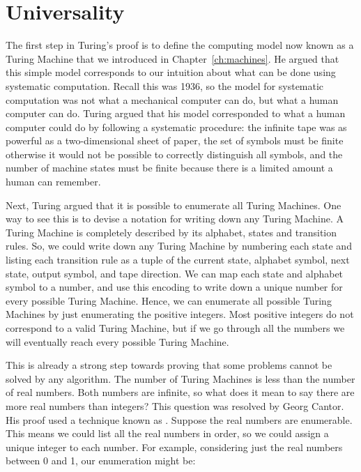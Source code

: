 \section{Universality}\label{sec:universality}

The first step in Turing's proof is to define the computing model now known as a Turing Machine that we introduced in Chapter~\ref{ch:machines}.  He argued that this simple model corresponds to our intuition about what can be done using systematic computation.  Recall this was 1936, so the model for systematic computation was not what a mechanical computer can do, but what a human computer can do.  Turing argued that his model corresponded to what a human computer could do by following a systematic procedure: the infinite tape was as powerful as a two-dimensional sheet of paper, the set of symbols must be finite otherwise it would not be possible to correctly distinguish all symbols, and the number of machine states must be finite because there is a limited amount a human can remember.  

Next, Turing argued that it is possible to enumerate all Turing Machines.  One way to see this is to devise a notation for writing down any Turing Machine.  A Turing Machine is completely described by its alphabet, states and transition rules.  So, we could write down any Turing Machine by numbering each state and listing each transition rule as a tuple of the current state, alphabet symbol, next state, output symbol, and tape direction.  We can map each state and alphabet symbol to a number, and use this encoding to write down a unique number for every possible Turing Machine.  Hence, we can enumerate all possible Turing Machines by just enumerating the positive integers.  Most positive integers do not correspond to a valid Turing Machine, but if we go through all the numbers we will eventually reach every possible Turing Machine.  

This is already a strong step towards proving that some problems cannot be solved by any algorithm.  The number of Turing Machines is less than the number of real numbers.  Both numbers are infinite, so what does it mean to say there are more real numbers than integers?  This question was resolved by Georg Cantor.  His proof used a technique known as .  Suppose the real numbers are enumerable.  This means we could list all the real numbers in order, so we could assign a unique integer to each number.  For example, considering just the real numbers between 0 and 1, our enumeration might be:

